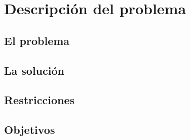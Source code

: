 \chapter{Descripción del problema}\label{cap:descripcion}

\section{El problema}

\section{La solución}

\section{Restricciones}

\section{Objetivos}